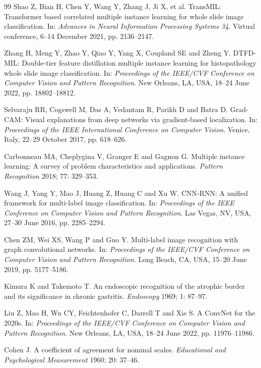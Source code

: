 \documentclass[Afour,sagev,times]{sagej}
\begin{document}
\begin{thebibliography}{99}
Shao Z, Bian H, Chen Y, Wang Y, Zhang J, Ji X, et al. TransMIL: Transformer based correlated multiple instance learning for whole slide image classification. In: \textit{Advances in Neural Information Processing Systems 34}. Virtual conference, 6--14 December 2021, pp. 2136--2147.

Zhang H, Meng Y, Zhao Y, Qiao Y, Yang X, Coupland SE and Zheng Y. DTFD-MIL: Double-tier feature distillation multiple instance learning for histopathology whole slide image classification. In: \textit{Proceedings of the IEEE/CVF Conference on Computer Vision and Pattern Recognition}. New Orleans, LA, USA, 18--24 June 2022, pp. 18802--18812.

Selvaraju RR, Cogswell M, Das A, Vedantam R, Parikh D and Batra D. Grad-CAM: Visual explanations from deep networks via gradient-based localization. In: \textit{Proceedings of the IEEE International Conference on Computer Vision}. Venice, Italy, 22--29 October 2017, pp. 618--626.

Carbonneau MA, Cheplygina V, Granger E and Gagnon G. Multiple instance learning: A survey of problem characteristics and applications. \textit{Pattern Recognition} 2018; 77: 329--353.

Wang J, Yang Y, Mao J, Huang Z, Huang C and Xu W. CNN-RNN: A unified framework for multi-label image classification. In: \textit{Proceedings of the IEEE Conference on Computer Vision and Pattern Recognition}. Las Vegas, NV, USA, 27--30 June 2016, pp. 2285--2294.

Chen ZM, Wei XS, Wang P and Guo Y. Multi-label image recognition with graph convolutional networks. In: \textit{Proceedings of the IEEE/CVF Conference on Computer Vision and Pattern Recognition}. Long Beach, CA, USA, 15--20 June 2019, pp. 5177--5186.

Kimura K and Takemoto T. An endoscopic recognition of the atrophic border and its significance in chronic gastritis. \textit{Endoscopy} 1969; 1: 87--97.

Liu Z, Mao H, Wu CY, Feichtenhofer C, Darrell T and Xie S. A ConvNet for the 2020s. In: \textit{Proceedings of the IEEE/CVF Conference on Computer Vision and Pattern Recognition}. New Orleans, LA, USA, 18--24 June 2022, pp. 11976--11986.

Cohen J. A coefficient of agreement for nominal scales. \textit{Educational and Psychological Measurement} 1960; 20: 37--46.


\end{thebibliography}
\end{document}
